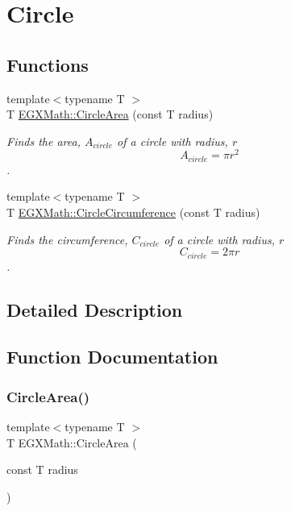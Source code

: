 \hypertarget{group___e_g_x_math-_geometry-2_d-_circle}{}\section{Circle}
\label{group___e_g_x_math-_geometry-2_d-_circle}
\subsection*{Functions}
\begin{DoxyCompactItemize}
\item 
{\footnotesize template$<$typename T $>$ }\\T \mbox{\hyperlink{group___e_g_x_math-_geometry-2_d-_circle_gabf5aadec991cc2bbf9d74fd83c46f40d}{E\+G\+X\+Math\+::\+Circle\+Area}} (const T radius)
\begin{DoxyCompactList}\small\item\em Finds the area, $A_{circle}$ of a circle with radius, $r$ \[ A_{circle}=\pi r^2 \]. \end{DoxyCompactList}\item 
{\footnotesize template$<$typename T $>$ }\\T \mbox{\hyperlink{group___e_g_x_math-_geometry-2_d-_circle_gadb55695b75a06a3f3534494eb767e18e}{E\+G\+X\+Math\+::\+Circle\+Circumference}} (const T radius)
\begin{DoxyCompactList}\small\item\em Finds the circumference, $C_{circle}$ of a circle with radius, $r$ \[ C_{circle}=2 \pi r \]. \end{DoxyCompactList}\end{DoxyCompactItemize}


\subsection{Detailed Description}


\subsection{Function Documentation}
\mbox{\label{group___e_g_x_math-_geometry-2_d-_circle_gabf5aadec991cc2bbf9d74fd83c46f40d}} 
\subsubsection{\texorpdfstring{Circle\+Area()}{CircleArea()}}
{\footnotesize\ttfamily template$<$typename T $>$ \\
T E\+G\+X\+Math\+::\+Circle\+Area (\begin{DoxyParamCaption}\item[{const T}]{radius }\end{DoxyParamCaption})}



